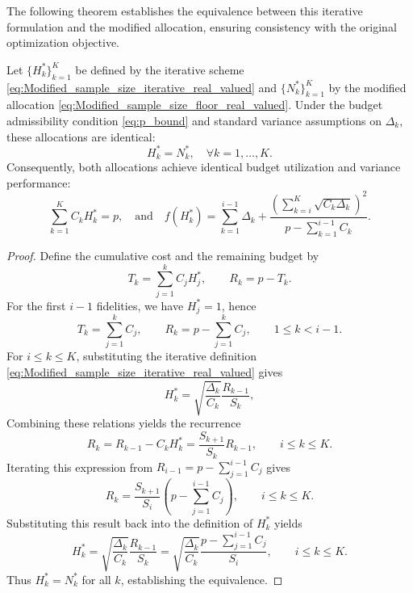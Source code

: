 The following theorem establishes the equivalence between this iterative formulation and the modified allocation, ensuring consistency with the original optimization objective.






\begin{theorem}
\label{thm:MFMC_modified_Iterative_RealValued_Sample_Size}
Let $\{H_k^*\}_{k=1}^K$ be defined by the iterative scheme \eqref{eq:Modified_sample_size_iterative_real_valued} and $\{N_k^*\}_{k=1}^K$ by the modified allocation \eqref{eq:Modified_sample_size_floor_real_valued}. Under the budget admissibility condition \eqref{eq:p_bound} and standard variance assumptions on $\Delta_k$, these allocations are identical:
\[
H_k^* = N_k^*, \quad \forall k = 1,\ldots,K.
\]
Consequently, both allocations achieve identical budget utilization and variance performance:
\[
\sum_{k=1}^K C_k H_k^* = p, 
\quad \text{and} \quad
f(H_k^*) = \sum_{k=1}^{i-1} \Delta_k + \frac{\left(\sum_{k=i}^K \sqrt{C_k \Delta_k}\right)^2}{p - \sum_{k=1}^{i-1} C_k}.
\]
\end{theorem}



\begin{proof}
Define the cumulative cost and the remaining budget by
%
\[
T_k = \sum_{j=1}^k C_j H_j^*, 
\qquad 
R_k = p - T_k.
\]
%
For the first $i-1$ fidelities, we have $H_j^* = 1$, hence
%
\[
T_k = \sum_{j=1}^k C_j, \qquad R_k = p - \sum_{j=1}^k C_j, \qquad 1 \le k < i-1.
\]
%
For $i \le k \le K$, substituting the iterative definition \eqref{eq:Modified_sample_size_iterative_real_valued} gives
%
\[
H_k^* 
= \sqrt{\frac{\Delta_k}{C_k}}
  \frac{R_{k-1}}{S_k},
\]
%
Combining these relations yields the recurrence
%
\[
R_k = R_{k-1} - C_k H_k^*
=
\frac{S_{k+1}}
       {S_k} R_{k-1},
\qquad i \le k \le K.
\]
%
Iterating this expression from $R_{i-1} = p - \sum_{j=1}^{i-1} C_j$ gives
%
\[
R_k 
= 
\frac{S_{k+1}}
       {S_i}
  \left( p - \sum_{j=1}^{i-1} C_j \right),
\qquad i \le k \le K.
\]
%
Substituting this result back into the definition of $H_k^*$ yields
%
\[
H_k^*
= \sqrt{\frac{\Delta_k}{C_k}}
  \frac{R_{k-1}}{S_k}
= \sqrt{\frac{\Delta_k}{C_k}}
  \frac{p - \sum_{j=1}^{i-1} C_j}
       {S_i},
\qquad i \le k \le K.
\]
%
Thus $H_k^* = N_k^*$ for all $k$, establishing the equivalence. 
\end{proof}


